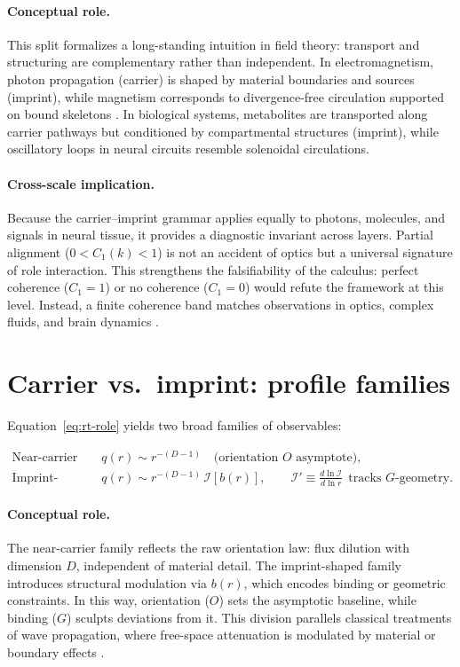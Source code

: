 \documentclass[12pt,a4paper,oneside]{scrreprt}
\begin{document}
\paragraph{Conceptual role.} 
This split formalizes a long-standing intuition in field theory: 
transport and structuring are complementary rather than independent. 
In electromagnetism, photon propagation (carrier) is shaped by material boundaries 
and sources (imprint), while magnetism corresponds to divergence-free circulation 
supported on bound skeletons \citep{Jackson1999Classical}. 
In biological systems, metabolites are transported along carrier pathways 
but conditioned by compartmental structures (imprint), 
while oscillatory loops in neural circuits resemble solenoidal circulations. 

\paragraph{Cross-scale implication.} 
Because the carrier–imprint grammar applies equally to photons, molecules, 
and signals in neural tissue, it provides a diagnostic invariant across layers. 
Partial alignment ($0 < C_1(k) < 1$) is not an accident of optics but 
a universal signature of role interaction. 
This strengthens the falsifiability of the calculus: 
perfect coherence ($C_1 = 1$) or no coherence ($C_1 = 0$) 
would refute the framework at this level. 
Instead, a finite coherence band matches observations in optics, 
complex fluids, and brain dynamics 
\citep{Mandel1995Optical,Buzsaki2006Rhythms}.

\section{Carrier vs.\ imprint: profile families}\label{sec:carrier-imprint}

Equation~\eqref{eq:rt-role} yields two broad families of observables:

\begin{align}
\text{Near-carrier dominated: } & q(r) \sim r^{-(D-1)} 
\quad \text{(orientation $O$ asymptote)}, \\[0.5em]
\text{Imprint-shaped: } & q(r) \sim r^{-(D-1)} \, \mathcal I[b(r)], 
\qquad 
\mathcal I' \equiv \frac{d\ln \mathcal I}{d\ln r} \ \ \text{tracks $G$-geometry}.
\end{align}

\paragraph{Conceptual role.} 
The near-carrier family reflects the raw orientation law: flux dilution with 
dimension $D$, independent of material detail. 
The imprint-shaped family introduces structural modulation via $b(r)$, 
which encodes binding or geometric constraints. 
In this way, orientation ($O$) sets the asymptotic baseline, 
while binding ($G$) sculpts deviations from it. 
This division parallels classical treatments of wave propagation, 
where free-space attenuation is modulated by material or boundary effects 
\citep{Jackson1999Classical}.
\end{document}
